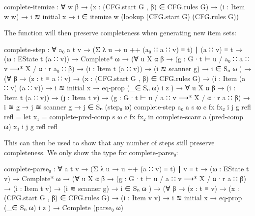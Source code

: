 		\begin{code}
			  complete-itemize : ∀ w {β} →
			    (x : (CFG.start G , β) ∈ CFG.rules G) →
			    (i : Item w w) →
			    i ≋ initial x →
			      i ∈ itemize w (lookup (CFG.start G) (CFG.rules G))
		\end{code}

		The  function will then preserve completeness when
		generating new item sets:

		\begin{code}
			  complete-step : ∀ {a₀ a t v} →
			    (Σ λ u → u ++ (a₀ ∷ a ∷ v) ≡ t) ∣ (a ∷ v) ≡ t →
			    (ω : EState t (a ∷ v)) →
			    Complete* ω →
			    (∀ {u X α β} →
			      (g : G ∙ t ⊢ u / a₀ ∷ a ∷ v ⟶* X / α ∙ r a₀ ∷ β) →
			      (i : Item t (a ∷ v)) → (i ≋ scanner g) →
			      i ∈ Sₙ ω
			    ) →
			    (∀ {β} →
			      (z : t ≡ a ∷ v) →
			      (x : (CFG.start G , β) ∈ CFG.rules G) →
			      (i : Item (a ∷ v) (a ∷ v)) →
			      i ≋ initial x → eq-prop (_∈ Sₙ ω) i z
			    ) →
			    ∀ {u X α β} →
			    (i : Item t (a ∷ v)) →
			    (j : Item t v) →
			    (g : G ∙ t ⊢ u / a ∷ v ⟶* X / α ∙ r a ∷ β) →
			    i ≋ g →
			    j ≋ scanner g →
			      j ∈ Sₙ (step₀ ω)
			  complete-step {a₀} {a} s ω c fx fx₂ i j g refl refl =
			    let
			      x₁ = complete-pred-comp s ω c fx fx₂
			    in complete-scanr a (pred-comp ω) x₁ i j g refl refl
		\end{code}

		This can then be used to show that any number of steps still preserve
		completeness. We only show the type for complete-parse₀:

		\begin{code}
			  complete-parse₀ : ∀ {a t v} →
			    (Σ λ u → u ++ (a ∷ v) ≡ t) ∣ v ≡ t →
			    (ω : EState t v) →
			    Complete* ω →
			    (∀ {u X α β} →
			      (g : G ∙ t ⊢ u / a ∷ v ⟶* X / α ∙ r a ∷ β) →
			      (i : Item t v) → (i ≋ scanner g) →
			      i ∈ Sₙ ω
			    ) →
			    (∀ {β} →
			      (z : t ≡ v) →
			      (x : (CFG.start G , β) ∈ CFG.rules G) →
			      (i : Item v v) →
			      i ≋ initial x → eq-prop (_∈ Sₙ ω) i z
			    ) →
			    Complete (parse₀ ω)
		\end{code}

